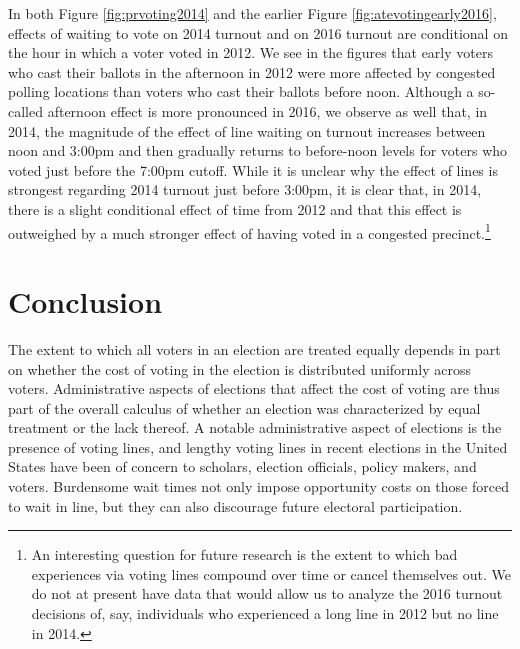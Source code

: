 \documentclass[12pt,titlepage]{article}
\begin{document}
In both Figure \ref{fig:prvoting2014} and the earlier Figure
\ref{fig:atevotingearly2016}, effects of waiting to vote on 2014
turnout and on 2016 turnout are conditional on the hour in which a
voter voted in 2012.  We see in the figures that early voters who cast
their ballots in the afternoon in 2012 were more affected by congested
polling locations than voters who cast their ballots before noon.
Although a so-called afternoon effect is more pronounced in 2016, we
observe as well that, in 2014, the magnitude of the effect of line
waiting on turnout increases between noon and 3:00pm and then
gradually returns to before-noon levels for voters who voted just
before the 7:00pm cutoff.  While it is unclear why the effect of lines
is strongest regarding 2014 turnout just before 3:00pm, it is clear
that, in 2014, there is a slight conditional effect of time from 2012
and that this effect is outweighed by a much stronger effect of having
voted in a congested precinct.\footnote{An interesting question for
  future research is the extent to which bad experiences via voting
  lines compound over time or cancel themselves out.  We do not at
  present have data that would allow us to analyze the 2016 turnout
  decisions of, say, individuals who experienced a long line in 2012
  but no line in 2014.}



\section*{Conclusion}

The extent to which all voters in an election are treated equally
depends in part on whether the cost of voting in the election is
distributed uniformly across voters. Administrative aspects of
elections that affect the cost of voting are thus part of the overall
calculus of whether an election was characterized by equal treatment
or the lack thereof.  A notable administrative aspect of elections is
the presence of voting lines, and lengthy voting lines in recent
elections in the United States have been of concern to scholars,
election officials, policy makers, and voters.  Burdensome wait times
not only impose opportunity costs on those forced to wait in line, but
they can also discourage future electoral participation.
\end{document}
